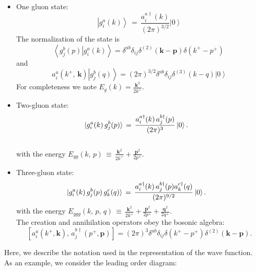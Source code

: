 \documentclass[a4paper,11pt]{article}
\begin{document}
\begin{itemize}
  \item One gluon state:  
    \begin{equation}
      \label{gsta}
  \left|g_{i}^{a}(k)\right\rangle \, = \,\frac{a_{i}^{a\dagger}(k)}{(2\pi)^{3/2}}\left|0\right\rangle 
\end{equation}
The normalization of the state is 
$$
\left\langle g_{j}^{b}(p)\left|g_{i}^{a}(k)\right.\right\rangle
=\delta^{ab}\delta_{ij}\delta^{(2)}(\mathbf{k}-\mathbf{p})\delta(k^{+}-p^{+})\;$$ 
and 
\begin{equation}
 a_{i}^{a}(k^{+},\, \mathbf{k})\left|g^b_j(q)\right\rangle = (2\pi )^{3/2}\delta^{ab} \delta_{ij}\delta^{(3)}(k-q)  \left| 0 \right\rangle
\end{equation}
For completeness we  note $E_{g}(k)=\frac{\mathbf{k}^{2}}{2k^{+}}.$ 
\item Two-gluon state: 
\begin{equation}
\begin{split}\label{ggst}
&\ket{g_{i}^{a}(k)\, g_{j}^{b}(p)} \,= \,\frac{a_{i}^{a\dagger}(k)\, a_{j}^{b\dagger}(p)}{(2\pi)^{3}}\left|0\right\rangle.
\end{split}
\end{equation}\\
  with the energy $E_{gg}(k,\, p)\,\equiv\,\frac{\mathbf{k}^{2}}{2k^{+}}+\frac{\mathbf{p}^{2}}{2p^{+}}$.\\
\item Three-gluon state: 
  \begin{equation}\begin{split}\label{gggst}
&\ket{g_{i}^{a}(k)\, g_{j}^{b}(p)\, g^{c}_{k}(q)} \,= \,\frac{a_{i}^{a\dagger}(k)\, a_{j}^{b\dagger}(p)a_{k}^{c\dagger}(q)}{(2\pi)^{9/2}}\left|0\right\rangle.
  \end{split}\end{equation}
with the energy {\color{chg}$E_{ggg}(k,\, p,\,q)$}$\,\equiv\,\frac{\mathbf{k}^{2}}{2k^{+}}+\frac{\mathbf{p}^{2}}{2p^{+}}+\frac{\mathbf{q}^{2}}{2q^{+}}$.  \\
The creation and annihilation operators obey the bosonic algebra:
\begin{equation}
\left[a_{i}^{a}(k^{+},\mathbf{k}),\, a_{j}^{b\dagger}(p^{+},\mathbf{p})\right]=(2\pi)^{3}\delta^{ab}\delta_{ij}\delta(k^{+}-p^{+})\delta^{(2)}(\mathbf{k}-\mathbf{p}).
 \end{equation}
\end{itemize}
Here, we describe the notation used in the representation of the wave function. As an example, we consider the leading order diagram:
\end{document}
